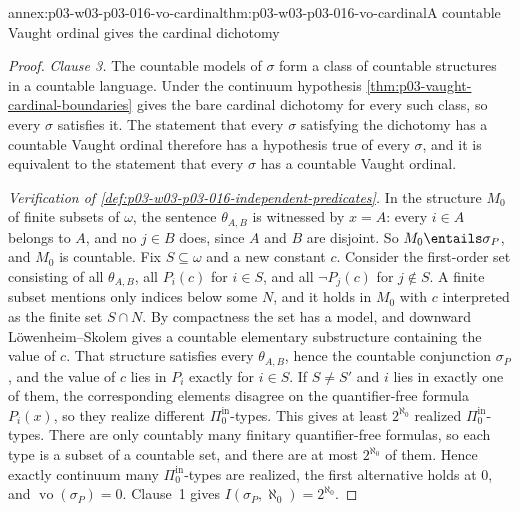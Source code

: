 \begin{annexitem}{annex:p03-w03-p03-016-vo-cardinal}{thm:p03-w03-p03-016-vo-cardinal}{A countable Vaught ordinal gives the cardinal dichotomy}
\begin{proof}
\emph{Clause 3.} The countable models of \(\sigma\) form a class of
countable structures in a countable language. Under the continuum
hypothesis \cref{thm:p03-vaught-cardinal-boundaries} gives the bare
cardinal dichotomy for every such class, so every \(\sigma\) satisfies it.
The statement that every \(\sigma\) satisfying the dichotomy has a countable
Vaught ordinal therefore has a hypothesis true of every \(\sigma\), and it
is equivalent to the statement that every \(\sigma\) has a countable Vaught
ordinal.

\emph{Verification of \cref{def:p03-w03-p03-016-independent-predicates}.}
In the structure \(M_0\) of finite subsets of \(\omega\), the sentence
\(\theta_{A,B}\) is witnessed by \(x=A\): every \(i\in A\) belongs to
\(A\), and no \(j\in B\) does, since \(A\) and \(B\) are disjoint. So
\(M_0\entails\sigma_P\), and \(M_0\) is countable. Fix
\(S\subseteq\omega\) and a new constant \(c\). Consider the first-order set
consisting of all \(\theta_{A,B}\), all \(P_i(c)\) for \(i\in S\), and all
\(\neg P_j(c)\) for \(j\notin S\). A finite subset mentions only indices
below some \(N\), and it holds in \(M_0\) with \(c\) interpreted as the
finite set \(S\cap N\). By compactness the set has a model, and downward
L\"owenheim--Skolem gives a countable elementary substructure containing
the value of \(c\). That structure satisfies every \(\theta_{A,B}\), hence
the countable conjunction \(\sigma_P\), and the value of \(c\) lies in
\(P_i\) exactly for \(i\in S\). If \(S\ne S'\) and \(i\) lies in exactly
one of them, the corresponding elements disagree on the quantifier-free
formula \(P_i(x)\), so they realize different
\(\Pi^{\mathrm{in}}_0\)-types. This gives at least \(2^{\aleph_0}\)
realized \(\Pi^{\mathrm{in}}_0\)-types. There are only countably many
finitary quantifier-free formulas, so each type is a subset of a countable
set, and there are at most \(2^{\aleph_0}\) of them. Hence exactly
continuum many \(\Pi^{\mathrm{in}}_0\)-types are realized, the first
alternative holds at \(0\), and \(\operatorname{vo}(\sigma_P)=0\). Clause~1
gives \(I(\sigma_P,\aleph_0)=2^{\aleph_0}\).
\end{proof}
\end{annexitem}
